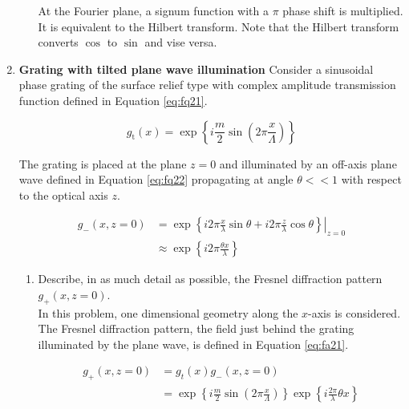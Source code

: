 \documentclass[main.tex]{subfiles}
\begin{document}
\begin{enumerate}
\begin{enumerate}
At the  Fourier plane, a signum function with a $\pi$ phase shift is multiplied. It is equivalent to the Hilbert transform. Note that the Hilbert transform converts $\cos$ to $\sin$ and vise versa.

\end{enumerate}

\item{\textbf{Grating with tilted plane wave illumination} Consider a sinusoidal phase grating of the surface relief type with complex amplitude transmission function defined in Equation \ref{eq:fq21}}.

\begin{equation}\label{eq:fq21}
g_{\mathrm{t}}(x)=\exp \left\{i \frac{m}{2} \sin \left(2 \pi \frac{x}{\Lambda}\right)\right\}
\end{equation}

The grating is placed at the plane $z=0$ and illuminated by an off-axis plane wave defined in Equation \ref{eq:fq22} propagating at angle $\theta << 1$ with respect to the optical axis $z$.

\begin{equation}\label{eq:fq22}
\begin{aligned} 
g_{-}(x, z=0)&=\left.\exp \left\{i 2 \pi \frac{x}{\lambda} \sin \theta+i 2 \pi \frac{z}{\lambda} \cos \theta\right\}\right|_{z=0} \\
&\approx \exp \left\{i 2 \pi \frac{\theta x}{\lambda}\right\}
\end{aligned} 
\end{equation}

\begin{enumerate}
\item{Describe, in as much detail as possible, the Fresnel diffraction pattern $g_+(x,z=0)$.} \\

In this problem, one dimensional geometry along the $x$-axis is considered. The Fresnel diffraction pattern, the field just behind the grating illuminated by the plane wave, is defined in Equation \ref{eq:fa21}.

\begin{equation}\label{eq:fa21}
\begin{aligned} 
g_{+}(x, z=0)&=g_{t}(x) g_{-}(x, z=0)\\
&=\exp \left\{i \frac{m}{2} \sin \left(2 \pi \frac{x}{\Lambda}\right)\right\} \exp \left\{i \frac{2 \pi}{\lambda} \theta x\right\}
\end{aligned} 
\end{equation}


\end{enumerate}
\end{enumerate}
\end{document}
